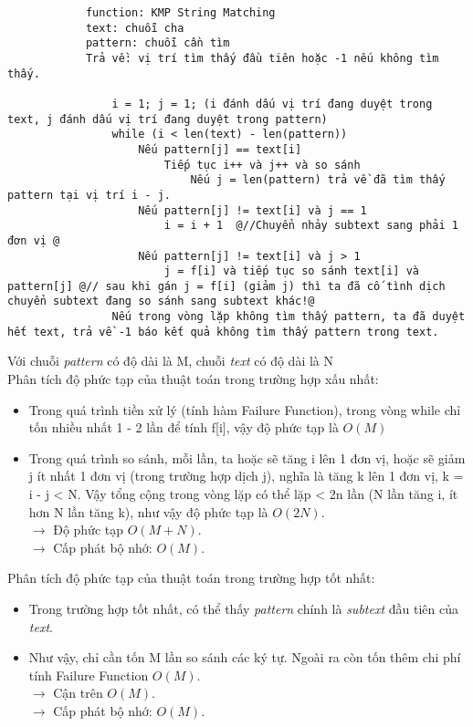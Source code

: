 \documentclass[a4paper,11pt]{article}
\begin{document}
\begin{enumerate}
\begin{lstlisting}
			function: KMP String Matching
			text: chuỗi cha 
			pattern: chuỗi cần tìm 
			Trả về: vị trí tìm thấy đầu tiên hoặc -1 nếu không tìm thấy.

				i = 1; j = 1; (i đánh dấu vị trí đang duyệt trong text, j đánh dấu vị trí đang duyệt trong pattern)
				while (i < len(text) - len(pattern))
					Nếu pattern[j] == text[i]
						Tiếp tục i++ và j++ và so sánh
							Nếu j = len(pattern) trả về đã tìm thấy pattern tại vị trí i - j.
					Nếu pattern[j] != text[i] và j == 1
						i = i + 1  @//Chuyển nhảy subtext sang phải 1 đơn vị @
					Nếu pattern[j] != text[i] và j > 1
						j = f[i] và tiếp tục so sánh text[i] và pattern[j] @// sau khi gán j = f[i] (giảm j) thì ta đã cố tình dịch chuyển subtext đang so sánh sang subtext khác!@
				Nếu trong vòng lặp không tìm thấy pattern, ta đã duyệt hết text, trả về -1 báo kết quả không tìm thấy pattern trong text.
					\end{lstlisting}
			
			Với chuỗi \textit{pattern} có độ dài là M, chuỗi \textit{text} có độ dài là N \\
			Phân tích độ phức tạp của thuật toán trong trường hợp xấu nhất:
			\begin{itemize}
				\item Trong quá trình tiền xử lý (tính hàm Failure Function), trong vòng while chỉ tốn nhiều nhất 1 - 2 lần để tính f[i], vậy độ 
				phức tạp là $O(M)$
				\item Trong quá trình so sánh, mỗi lần, ta hoặc sẽ tăng i lên 1 đơn vị, hoặc sẽ giảm j ít nhất 1 đơn vị (trong trường hợp dịch j), nghĩa là tăng k lên 1 đơn vị, k = i - j < N.
				Vậy tổng cộng trong vòng lặp có thể lặp < 2n lần (N lần tăng i, ít hơn N lần tăng k), như vậy độ phức tạp là $O(2N)$.\\
				$\to$ Độ phức tạp $O(M + N)$.\\
				$\to$ Cấp phát bộ nhớ: $O(M)$.
			\end{itemize}

			Phân tích độ phức tạp của thuật toán trong trường hợp tốt nhất:
			\begin{itemize}
				\item Trong trường hợp tốt nhất, có thể thấy \textit{pattern} chính là \textit{subtext} đầu tiên của \textit{text}.
				\item Như vậy, chỉ cần tốn M lần so sánh các ký tự. Ngoài ra còn tốn thêm chi phí tính Failure Function $O(M)$.\\
				$\to$ Cận trên $O(M)$. \\
				$\to$ Cấp phát bộ nhớ: $O(M)$.
			\end{itemize}


\end{enumerate}
\end{document}
